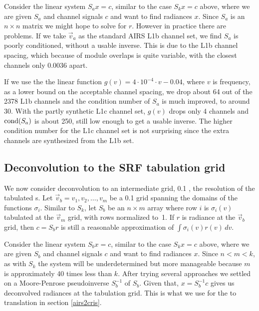\documentclass[12pt]{article}
\begin{document}
Consider the linear system $S_a x = c$, similar to the case 
$S_k x = c$ above, where we are given $S_a$ and channel signals $c$
and want to find radiances $x$.  Since $S_a$ is an $n \times n$
matrix we might hope to solve for $r$.  However in practice there
are problems.  If we take $\vec v_a$ as the standard AIRS L1b
channel set, we find $S_a$ is poorly conditioned, without a usable
inverse.  This is due to the L1b channel spacing, which because of
module overlaps is quite variable, with the closest channels only
0.0036 {\wn} apart.

If we use the the linear function $g(v) = 4\cdot 10^{-4} \cdot v -
0.04$, where $v$ is frequency, as a lower bound on the acceptable
channel spacing, we drop about 64 out of the 2378 L1b channels and
the condition number of $S_a$ is much improved, to around 30.  With
the partly synthetic L1c channel set, $g(v)$ drops only 4 channels
and $\hbox{cond}(S_a)$ is about 250, still low enough to get a
usable inverse.  The higher condition number for the L1c channel set
is not surprising since the extra channels are synthesized from the
L1b set.  

\subsection{Deconvolution to the SRF tabulation grid}

We now consider deconvolution to an intermediate grid, 0.1 {\wn},
the resolution of the tabulated {\airs} {\srf}s.  Let $\vec v_b =
v_1,v_2,\ldots,v_m$ be a 0.1 {\wn} grid spanning the domains of the
functions $\sigma_i$.  Similar to $S_k$, let $S_b$ be an $n\times m$
array where row $i$ is $\sigma_i(v)$ tabulated at the $\vec v_m$
grid, with rows normalized to~1.  If $r$ is radiance at the $\vec
v_b$ grid, then $c = S_b r$ is still a reasonable approximation of
$\int\sigma_i(v)r(v)\,dv$.

Consider the linear system $S_b x = c$, similar to the case 
$S_k x = c$ above, where we are given $S_b$ and channel signals $c$
and want to find radiances $x$.  Since $n < m < k$, as with $S_k$
the system will be underdetermined but more manageable because $m$
is approximately 40 times less than $k$.  After trying several
approaches we settled on a Moore-Penrose pseudoinverse $S_b^{-1}$ of
$S_b$.  Given that, $x = S_b^{-1} c$ gives us deconvolved radiances
at the {\srf} tabulation grid.  This is what we use for the {\airs}
to {\cris} translation in section \ref{airs2cris}.
\end{document}
